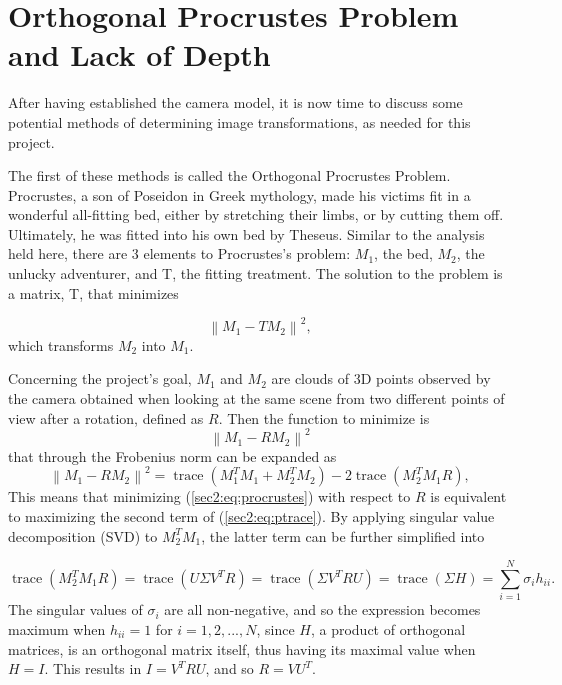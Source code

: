 
\section{Orthogonal Procrustes Problem and Lack of Depth}
\label{cha2:opprandsphere}

After having established the camera model, it is now time to discuss some potential methods of determining image transformations, as needed for this project. 

The first of these methods is called the Orthogonal Procrustes Problem. Procrustes, a son of Poseidon in Greek mythology, made his victims fit in a wonderful all-fitting bed, either by stretching their limbs, or by cutting them off. Ultimately, he was fitted into his own bed by Theseus. Similar to the analysis held here, there are 3 elements to Procrustes's problem: $M_1$, the bed, $M_2$, the unlucky adventurer, and T, the fitting treatment. The solution to the problem is a matrix, T, that minimizes

\begin{equation}
\label{sec2:eq:procrustes}
\left \| M_1 - TM_2  \right \|^2 ,
\end{equation}
which transforms $M_2$ into $M_1$. 

Concerning the project's goal, $M_1$ and $M_2$ are clouds of 3D points observed by the camera obtained when looking at the same scene from two different points of view after a rotation, defined as $R$. Then the function to minimize is
\begin{equation}
\label{sec2:eq:ptrace}
\left \| M_1 - RM_2 \right \|^2 
\end{equation}
that through the Frobenius norm can be expanded as
\begin{equation}
\label{sec2:eq:ptrace}
\left \| M_1 - RM_2 \right \|^2 = \operatorname { trace } ( M_1^T M_1 + M_2^T M_2) - 2 \operatorname { trace } (M_2^T M_1 R),
\end{equation}
This means that minimizing (\ref{sec2:eq:procrustes}) with respect to $R$ is equivalent to maximizing the second term of (\ref{sec2:eq:ptrace}). By applying singular value decomposition (SVD) to $M_2^T M_1$, the latter term can be further simplified into

\begin{equation}
\label{sec2:eq:svd}
\operatorname { trace } (M_2^T M_1 R) = \operatorname { trace } ( U \Sigma V^T R) = \operatorname { trace } (\Sigma V^T R U) = \operatorname { trace } (\Sigma H )  = \sum _ { i = 1 } ^ { N } \sigma _ { i }h _ { i i } .
\end{equation}
The singular values of $\sigma _ { i }$ are all non-negative, and so the expression becomes maximum when $h _ { i i } = 1$ for $i=1,2,...,N$, since $H$, a product of orthogonal matrices, is an orthogonal matrix itself, thus having its maximal value when $H = I$. This results in $I = V^T R U$, and so $R=V U^T$.   

